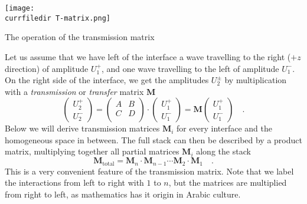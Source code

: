\begin{marginfigure}
\texttt{[image: \\currfiledir T-matrix.png]}

\caption{The operation of the transmission matrix
\label{fig:surface_T_matrix}}
\end{marginfigure}

Let us assume that we have left of the interface a wave travelling to the right ($+z$ direction) of amplitude $U_1^+$, and one wave travelling to the left of amplitude $U_1^-$. On the right side of the interface, we get the amplitudes $U_2^\pm$ by multiplication with a \emph{transmission} or \emph{transfer} matrix $\mathbf{M}$
\begin{equation}
\begin{pmatrix}
U_2^+ \\ U_2^-
\end{pmatrix}
= 
\begin{pmatrix}
A & B \\ C & D \\
\end{pmatrix}
\cdot
\begin{pmatrix}
U_1^+ \\ U_1^-
\end{pmatrix}
%
= \mathbf{M}
\begin{pmatrix}
U_1^+ \\ U_1^-
\end{pmatrix} \quad . \label{eq:surface_def_T_matrix}
\end{equation}
Below we will derive transmission matrices $\mathbf{M}_i$ for every interface and the homogeneous space in between. The full stack can then be described by a product matrix, multiplying together all partial matrices $\mathbf{M}_i$ along the stack
\begin{equation}
\mathbf{M}_\text{total} = \mathbf{M}_n \cdot  \mathbf{M}_{n-1} \cdots\mathbf{M}_2 \cdot  \mathbf{M}_{1} \quad . 
\end{equation}
This is a very convenient feature of the transmission matrix.
Note that we label the interactions from left to right with $1$ to $n$, but the matrices are multiplied from right to left, as mathematics has it origin in Arabic culture.



